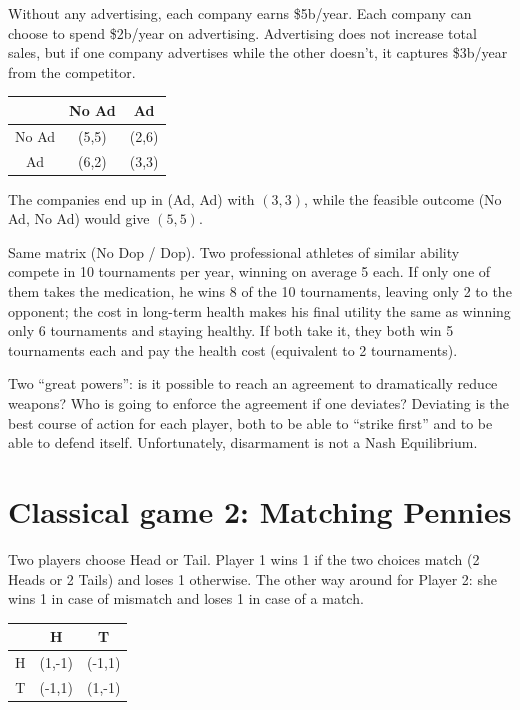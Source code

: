 \documentclass[11pt,a4paper,openany]{book}
\begin{document}
\begin{exbox}[title=Application: Coke-Pepsi advertising war]
Without any advertising, each company earns \$5b/year. Each company can choose to spend
\$2b/year on advertising. Advertising does not increase total sales, but if one company
advertises while the other doesn't, it captures \$3b/year from the competitor.
\begin{center}
\begin{tabular}{c|cc}
 & No Ad & Ad \\ \hline
No Ad & (5,5) & (2,6) \\
Ad    & (6,2) & (3,3)
\end{tabular}
\end{center}
The companies end up in (Ad, Ad) with $(3,3)$, while the feasible outcome (No Ad, No Ad)
would give $(5,5)$.
\end{exbox}

\begin{exbox}[title=Application: doping in sports]
Same matrix (No Dop / Dop). Two professional athletes of similar ability compete in 10
tournaments per year, winning on average 5 each. If only one of them takes the medication, he
wins 8 of the 10 tournaments, leaving only 2 to the opponent; the cost in long-term health
makes his final utility the same as winning only 6 tournaments and staying healthy. If both
take it, they both win 5 tournaments each and pay the health cost (equivalent to 2
tournaments).
\end{exbox}

\begin{exbox}[title=Application: is disarmament possible?]
Two ``great powers'': is it possible to reach an agreement to dramatically reduce weapons?
Who is going to enforce the agreement if one deviates? Deviating is the best course of action
for each player, both to be able to ``strike first'' and to be able to defend itself.
Unfortunately, disarmament is not a Nash Equilibrium.
\end{exbox}


\section{Classical game 2: Matching Pennies}

\begin{exbox}[title=Matching Pennies]
Two players choose Head or Tail. Player 1 wins 1 if the two choices match (2 Heads or 2
Tails) and loses 1 otherwise. The other way around for Player 2: she wins 1 in case of
mismatch and loses 1 in case of a match.
\begin{center}
\begin{tabular}{c|cc}
 & H & T \\ \hline
H & (1,-1) & (-1,1) \\
T & (-1,1) & (1,-1)
\end{tabular}
\end{center}
\end{exbox}
\end{document}

